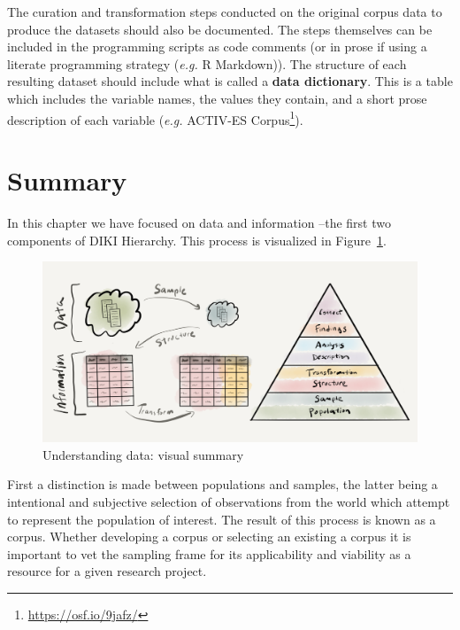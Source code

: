 \documentclass[
  letterpaper,
]{scrbook}
\DeclareRobustCommand{\href}[2]{#2\footnote{\url{#1}}}
\begin{document}
The curation and transformation steps conducted on the original corpus
data to produce the datasets should also be documented. The steps
themselves can be included in the programming scripts as code comments
(or in prose if using a literate programming strategy (\emph{e.g.} R
Markdown)). The structure of each resulting dataset should include what
is called a \textbf{data dictionary}. This is a table which includes the
variable names, the values they contain, and a short prose description
of each variable (\emph{e.g.} \href{https://osf.io/9jafz/}{ACTIV-ES
Corpus}).

\hypertarget{summary-2}{%
\section*{Summary}\label{summary-2}}


In this chapter we have focused on data and information --the first two
components of DIKI Hierarchy. This process is visualized in
Figure~\ref{fig-understanding-data-vis-sum}.

\begin{figure}[h]

{\centering \includegraphics[width=6.91in,height=\textheight]{./figures/understanding-data/understanding-data_visual-summary-paper.png}

}

\caption{\label{fig-understanding-data-vis-sum}Understanding data:
visual summary}

\end{figure}

First a distinction is made between populations and samples, the latter
being a intentional and subjective selection of observations from the
world which attempt to represent the population of interest. The result
of this process is known as a corpus. Whether developing a corpus or
selecting an existing a corpus it is important to vet the sampling frame
for its applicability and viability as a resource for a given research
project.
\end{document}
